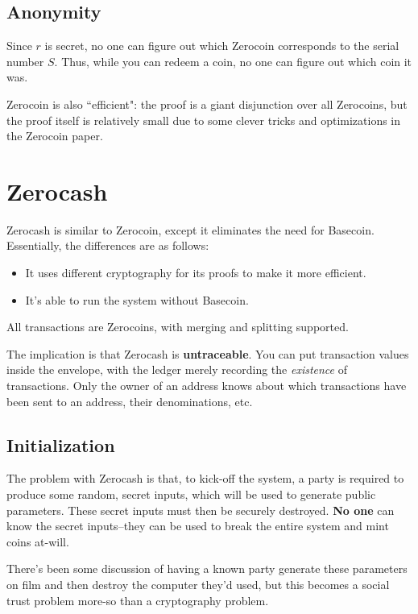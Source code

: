 \documentclass[12pt]{article}
\begin{document}
\subsection*{Anonymity}

Since $r$ is secret, no one can figure out which Zerocoin corresponds to the serial number $S$. Thus, while you can redeem a coin, no one can figure out which coin it was.

Zerocoin is also ``efficient": the proof is a giant disjunction over all Zerocoins, but the proof itself is relatively small due to some clever tricks and optimizations in the Zerocoin paper.

\section*{Zerocash}

Zerocash is similar to Zerocoin, except it eliminates the need for Basecoin. Essentially, the differences are as follows:
\begin{itemize}
\item It uses different cryptography for its proofs to make it more efficient.
\item It's able to run the system without Basecoin.
\end{itemize}

All transactions are Zerocoins, with merging and splitting supported.

The implication is that Zerocash is \textbf{untraceable}. You can put transaction values inside the envelope, with the ledger merely recording the \textit{existence} of transactions. Only the owner of an address knows about which transactions have been sent to an address, their denominations, etc.

\subsection*{Initialization}

The problem with Zerocash is that, to kick-off the system, a party is required to produce  some random, secret inputs, which will be used to generate public parameters. These secret inputs must then be securely destroyed. \textbf{No one} can know the secret inputs--they can be used to break the entire system and mint coins at-will.

There's been some discussion of having a known party generate these parameters on film and then destroy the computer they'd used, but this becomes a social trust problem more-so than a cryptography problem.
\end{document}
